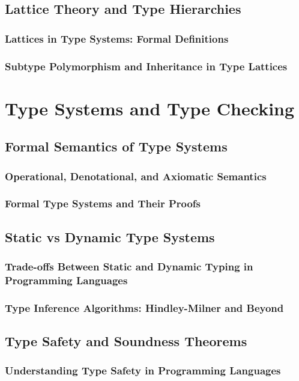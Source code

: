\documentclass[12pt, oneside]{book}
\begin{document}
\subsection{Lattice Theory and Type Hierarchies}
\subsubsection{Lattices in Type Systems: Formal Definitions}
\subsubsection{Subtype Polymorphism and Inheritance in Type Lattices}

\section{Type Systems and Type Checking}
\subsection{Formal Semantics of Type Systems}
\subsubsection{Operational, Denotational, and Axiomatic Semantics}
\subsubsection{Formal Type Systems and Their Proofs}
\subsection{Static vs Dynamic Type Systems}
\subsubsection{Trade-offs Between Static and Dynamic Typing in Programming Languages}
\subsubsection{Type Inference Algorithms: Hindley-Milner and Beyond}
\subsection{Type Safety and Soundness Theorems}
\subsubsection{Understanding Type Safety in Programming Languages}
\end{document}
